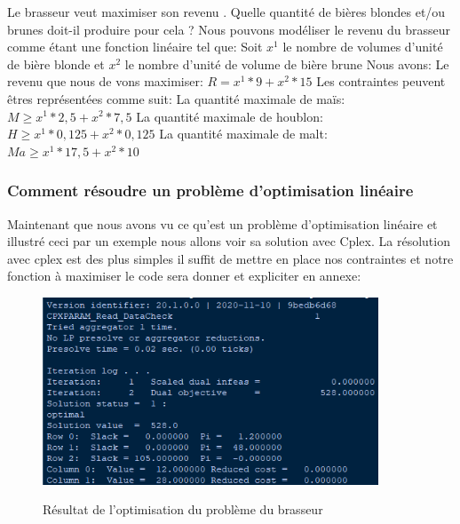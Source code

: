 Le brasseur veut maximiser son revenu .\newline
Quelle quantité de bières blondes et/ou brunes doit-il produire pour cela ?\newline
\newline
Nous pouvons modéliser le revenu du brasseur comme étant une fonction linéaire tel que:\newline
Soit $x^{1}$ le nombre de volumes d'unité de bière blonde et $x^{2}$ le nombre d'unité de volume de bière brune\newline
Nous avons:\newline\newline
Le revenu que nous de vons maximiser: $R = x^{1}*9 + x^{2}*15$\newline\newline
Les contraintes peuvent êtres représentées comme suit:\newline\newline
La quantité maximale de maïs: $M \geq x^{1}*2,5+x^{2}*7,5$\newline
La quantité maximale de houblon: $H \geq x^{1}*0,125+x^{2}*0,125$\newline
La quantité maximale de malt: $Ma \geq x^{1}*17,5+x^{2}*10$\newline\newline

\subsubsection{Comment résoudre un problème d'optimisation linéaire}

 Maintenant que nous avons vu ce qu'est un problème d'optimisation linéaire et illustré ceci par un exemple nous allons voir sa solution avec Cplex.\newline
 La résolution avec cplex est des plus simples il suffit de mettre en place nos contraintes et notre fonction à maximiser le code sera donner et expliciter en annexe:

 \begin{figure}[h]
   \begin{center}
 \includegraphics[width=10cm]{./images/Brasseur_Resolution.png}\label{Resultat_Brasseur}
 \caption{Résultat de l'optimisation du problème du brasseur}
 \end{center}
 \end{figure}

